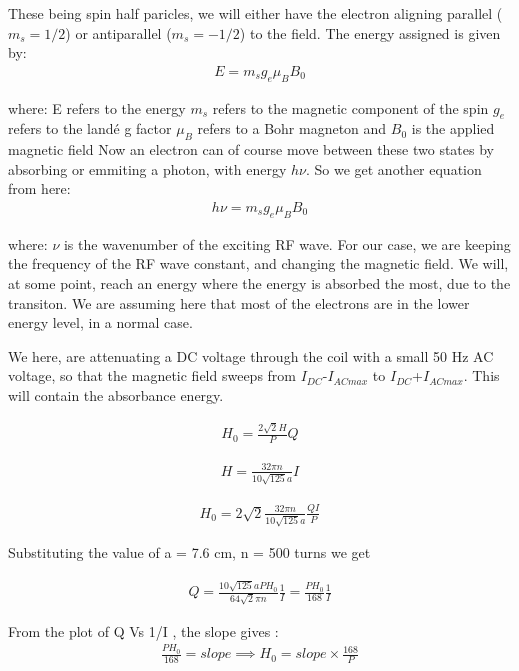\documentclass{double}
\begin{document}
These being spin half paricles, we will either have the electron aligning parallel ($m_s = 1/2$) or antiparallel ($m_s = -1/2$) to the field. The energy assigned is given by:
\begin{align}
 E = m_s g_e \mu_B B_0 
\end{align}

where:
E refers to the energy   
$m_s$ refers to the magnetic component of the spin  
$g_e$ refers to the landé g factor  
$\mu_B$ refers to a Bohr magneton  
and $B_0$ is the applied magnetic field  
Now an electron can of course move between these two states by absorbing or emmiting a photon, with energy $h\nu$. So we get another equation from here:  
\begin{align}
 h\nu=m_s g_e \mu_B B_0 \label{hnu} 
\end{align}

where:  
$\nu$ is the wavenumber of the exciting RF wave.  
For our case, we are keeping the frequency of the RF wave constant, and changing the magnetic field. We will, at some point, reach an energy where the energy is absorbed the most, due to the transiton. We are assuming here that most of the electrons are in the lower energy level, in a normal case.

We here, are attenuating a DC voltage through the coil with a small 50 Hz AC voltage, so that the magnetic field sweeps from $I_{DC}$-$I_{AC max}$ to $I_{DC}$+$I_{AC max}$. This will contain the absorbance energy. \cite{Da_2015}

\begin{align}
 H_0 = \frac{2\sqrt{2}H}{P}Q 
\end{align}

\begin{align}
 H=\frac{32\pi n}{10\sqrt{125}a}I 
\end{align}

\begin{align}
 H_0=2\sqrt{2}\frac{32\pi n}{10\sqrt{125}a}\frac{QI}{P} 
\end{align}

Substituting the value of a = 7.6 cm, n = 500 turns we get

\begin{align}
	 Q=\frac{10\sqrt{125}a PH_0}{64\sqrt{2}\pi n }\frac{1}{I}=\frac{PH_0}{168}\frac{1}{I} 
	\label{e:desc}
\end{align}

From the plot of Q Vs 1/I , the slope gives : 
\begin{align}
 \frac{PH_0}{168}=slope \implies H_0=slope \times \frac{168}{P} 
\end{align}
\end{document}
